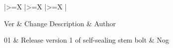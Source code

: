 \documentclass[a4paper,12pt]{article}
\def\arraystretch{1.5}%
\begin{document}
\bgroup

\small
\def\arraystretch{1.5}%
\begin{xltabular}{\textwidth}{
	|>{\hsize\linewidth=\hsize}X
	|>{\hsize\linewidth=\hsize}X
	|>{\hsize\linewidth=\hsize}X
	|
	}
	\hline


	Ver  &
	Change Description  &
	Author  \\ \hline \endhead

	01 & Release version 1 of self-sealing stem bolt & Nog \\ \hline

\end{xltabular}
\egroup
\end{document}

